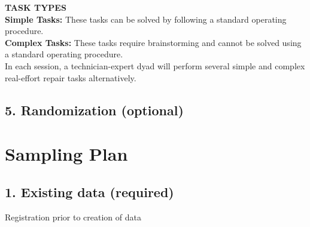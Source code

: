 \documentclass[A4,11pt]{article}
\renewcommand{\~}[1]{\tilde{#1}}
\renewcommand{\-}[1]{\overline{#1}}
\begin{document}
\textbf{TASK TYPES}\\
\textbf{Simple Tasks:} These tasks can be solved by following a standard operating procedure.\\
\textbf{Complex Tasks:} These tasks require brainstorming and cannot be solved using a standard operating procedure.\\

In each session, a technician-expert dyad will perform several simple and complex real-effort repair tasks alternatively. \\

\subsection*{5. Randomization (optional)}


\newpage

\section*{Sampling Plan}

\subsection*{1. Existing data (required) }
Registration prior to creation of data
\end{document}
